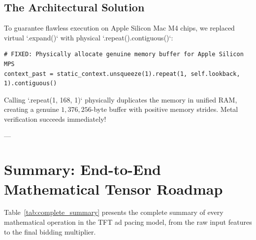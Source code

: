 \documentclass[11pt,a4paper]{article}
\begin{document}
\subsection{The Architectural Solution}
To guarantee flawless execution on Apple Silicon Mac M4 chips, we replaced virtual `.expand()` with physical `.repeat().contiguous()`:
\begin{lstlisting}
# FIXED: Physically allocate genuine memory buffer for Apple Silicon MPS
context_past = static_context.unsqueeze(1).repeat(1, self.lookback, 1).contiguous()
\end{lstlisting}
Calling `.repeat(1, 168, 1)` physically duplicates the memory in unified RAM, creating a genuine $1,376,256$-byte buffer with positive memory strides. Metal verification succeeds immediately!

---

\section{Summary: End-to-End Mathematical Tensor Roadmap}

Table~\ref{tab:complete_summary} presents the complete summary of every mathematical operation in the TFT ad pacing model, from the raw input features to the final bidding multiplier.
\end{document}
